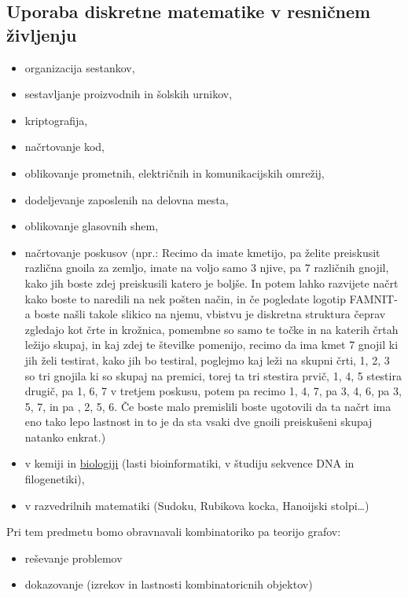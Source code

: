 \subsection{Uporaba diskretne matematike v resničnem življenju}

\begin{itemize}
    \item organizacija sestankov,
    \item sestavljanje proizvodnih in šolskih urnikov,
    \item kriptografija,
    \item načrtovanje kod,
    \item oblikovanje prometnih, električnih in komunikacijskih omrežij,
    \item dodeljevanje zaposlenih na delovna mesta,
    \item oblikovanje glasovnih shem,
    \item načrtovanje poskusov (npr.: Recimo da imate kmetijo, pa želite preiskusit različna gnoila za zemljo, imate na voljo samo 3 njive, pa 7 različnih gnojil, kako jih boste zdej preiskusili katero je boljše. In potem lahko razvijete načrt kako boste to naredili na nek pošten način, in če pogledate logotip FAMNIT-a boste našli takole slikico na njemu, vbistvu je diskretna struktura čeprav zgledajo kot črte in krožnica, pomembne so samo te točke in na katerih črtah ležijo skupaj,
    in kaj zdej te številke pomenijo, recimo da ima kmet 7 gnojil ki jih želi testirat, kako jih bo testiral, poglejmo kaj leži na skupni črti, 1, 2, 3 so tri gnojila ki so skupaj na premici, torej ta tri stestira prvič, 1, 4, 5 stestira drugič, pa 1, 6, 7 v tretjem poskusu, potem pa recimo 1, 4, 7, pa 3, 4, 6, pa 3, 5, 7, in pa , 2, 5, 6. Če boste malo premislili boste ugotovili da ta načrt ima eno tako lepo lastnost in to je da sta vsaki dve gnoili preiskušeni skupaj natanko enkrat.)
    
    \item v kemiji in \underline{biologiji} (lasti bioinformatiki, v študiju sekvence DNA in filogenetiki),
    \item v razvedrilnih matematiki (Sudoku, Rubikova kocka, Hanoijski stolpi\dots)
\end{itemize}

\begin{opomba}
    Pri tem predmetu bomo obravnavali kombinatoriko pa teorijo grafov:
    \begin{itemize}
        \item reševanje problemov 
        \item dokazovanje (izrekov in lastnosti kombinatoricnih objektov)
    \end{itemize}
\end{opomba}


